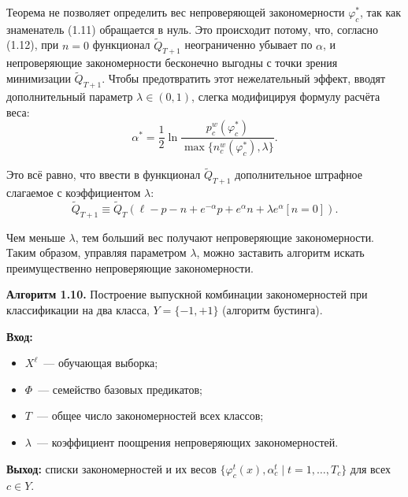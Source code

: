 Теорема не позволяет определить вес непроверяющей закономерности $\varphi_c^*$, так как знаменатель (1.11) обращается в нуль. Это происходит потому, что, согласно (1.12), при $n = 0$ функционал $\tilde{Q}_{T+1}$ неограниченно убывает по $\alpha$, и непроверяющие закономерности бесконечно выгодны с точки зрения минимизации $\tilde{Q}_{T+1}$. Чтобы предотвратить этот нежелательный эффект, вводят дополнительный параметр $\lambda \in (0, 1)$, слегка модифицируя формулу расчёта веса:
\begin{equation}
    \alpha^* = \frac{1}{2} \ln \frac{p_c^w(\varphi_c^*)}{\max\{n_c^w(\varphi_c^*), \lambda\}}.
\end{equation}

Это всё равно, что ввести в функционал $\tilde{Q}_{T+1}$ дополнительное штрафное слагаемое с коэффициентом $\lambda$:
\begin{equation}
    \tilde{Q}_{T+1} \equiv \tilde{Q}_T \left( \ell - p - n + e^{-\alpha} p + e^\alpha n + \lambda e^\alpha \left[ n = 0 \right] \right).
\end{equation}

Чем меньше $\lambda$, тем больший вес получают непроверяющие закономерности. Таким образом, управляя параметром $\lambda$, можно заставить алгоритм искать преимущественно непроверяющие закономерности.

\textbf{Алгоритм 1.10.} Построение выпускной комбинации закономерностей при классификации на два класса, $Y = \{-1, +1\}$ (алгоритм бустинга).

\textbf{Вход:}
\begin{itemize}
    \item $X^\ell$~--- обучающая выборка;
    \item $\Phi$~--- семейство базовых предикатов;
    \item $T$~--- общее число закономерностей всех классов;
    \item $\lambda$~--- коэффициент поощрения непроверяющих закономерностей.
\end{itemize}

\textbf{Выход:} списки закономерностей и их весов $\{ \varphi_c^t(x), \alpha_c^t \mid t = 1, \ldots, T_c \}$ для всех $c \in Y$.

